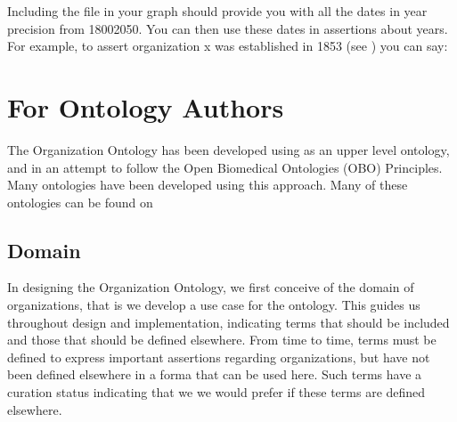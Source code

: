 \documentclass[letterpaper,10pt,english]{sphinxmanual}
\begin{document}
\sphinxAtStartPar
Including the file  in your graph should provide you with all the
dates in year precision from 1800\sphinxhyphen{}2050.  You can then use these dates in
assertions about years.  For example, to assert organization x was
established in 1853 (see {\hyperref[\detokenize{datetimes::doc}]{}}) you can say:

\begin{sphinxVerbatim}[commandchars=\\\{\}]
  
  
  
  
  
\end{sphinxVerbatim}


\chapter{For Ontology Authors}
\label{\detokenize{ontology-authors:for-ontology-authors}}\label{\detokenize{ontology-authors::doc}}
\sphinxAtStartPar
The Organization Ontology has been developed using  as an upper level ontology,
and in an attempt to follow the Open Biomedical Ontologies (OBO) Principles.  Many ontologies have been developed using
this approach.  Many of these ontologies can be found on 


\section{Domain}
\label{\detokenize{ontology-authors:domain}}
\sphinxAtStartPar
In designing the Organization Ontology, we first conceive of the domain of organizations,
that is we develop a use case for the ontology.  This  guides us
throughout design and implementation, indicating terms that should be included and those
that should be defined elsewhere.  From time to time, terms must be defined to
express important assertions regarding organizations, but have not been defined
elsewhere in a forma that can be used here.  Such terms have a curation status
indicating that we we would prefer if these terms are defined elsewhere.
\end{document}
